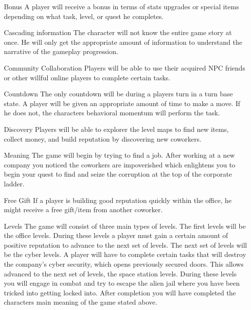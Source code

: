 \documentclass[12pt]{article}
\begin{document}
\begin{section}{Bonus}
A player will receive a bonus in terms of stats upgrades or special items
depending on what task, level, or quest he completes.
\end{section}

\begin{section}{Cascading information}
The character will not know the entire game story at once. He will only get the
appropriate amount of information to understand the narrative of the gameplay
progression.
\end{section}

\begin{section}{Community Collaboration}
Players will be able to use their acquired NPC friends or other willful online
players to complete certain tasks.
\end{section}

\begin{section}{Countdown}
The only countdown will be during a players turn in a turn base state. A player
will be given an appropriate amount of time to make a move. If he does not, the
characters behavioral momentum will perform the task.
\end{section}

\begin{section}{Discovery}
Players will be able to explorer the level maps to find new items, collect
money, and build reputation by discovering new coworkers.
\end{section}

\begin{section}{Meaning}
The game will begin by trying to find a job. After working at a new company you
noticed the coworkers are impoverished which enlightens you to begin your quest
to find and seize the corruption at the top of the corporate ladder.
\end{section}

\begin{section}{Free Gift}
If a player is building good reputation quickly within the office, he might
receive a free gift/item from another coworker.
\end{section}

\begin{section}{Levels}
The game will consist of three main types of levels. The first levels will be
the office levels. During these levels a player must gain a certain amount of
positive reputation to advance to the next set of levels. The next set of levels
will be the cyber levels. A player will have to complete certain tasks that will
destroy the company’s cyber security, which opens previously secured doors. This
allows advanced to the next set of levels, the space station levels. During
these levels you will engage in combat and try to escape the alien jail where
you have been tricked into getting locked into. After completion you will have
completed the characters main meaning of the game stated above.
\end{section}
\end{document}
